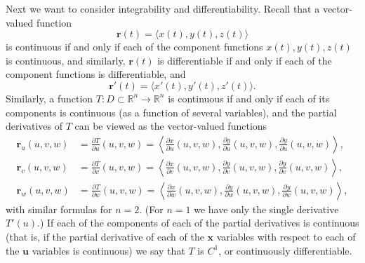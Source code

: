 \documentclass[12pt,letterpaper]{article}
\newcommand{\R}{\mathbb{R}}
\newcommand{\x}{\mathbf{x}}
\newcommand{\uu}{\mathbf{u}}
\renewcommand{\r}{\mathbf{r}}
\begin{document}
Next we want to consider integrability and differentiability. Recall that a vector-valued function
\[
\r(t) = \langle x(t),y(t),z(t)\rangle
\]
is continuous if and only if each of the component functions $x(t), y(t), z(t)$ is continuous, and similarly, $\r(t)$ is differentiable if and only if each of the component functions is differentiable, and 
\[
\r'(t) = \langle x'(t), y'(t), z'(t)\rangle.
\]
Similarly, a function $T:D\subset \R^n \to \R^n$ is continuous if and only if each of its components is continuous (as a function of several variables), and the partial derivatives of $T$ can be viewed as the vector-valued functions
\begin{align*}
\r_u(u,v,w) &= \frac{\partial T}{\partial u}(u,v,w) = \left<\frac{\partial x}{\partial u}(u,v,w),\frac{\partial y}{\partial u}(u,v,w),\frac{\partial y}{\partial u}(u,v,w)\right>,\\
\r_v(u,v,w) &= \frac{\partial T}{\partial v}(u,v,w) = \left<\frac{\partial x}{\partial v}(u,v,w),\frac{\partial y}{\partial v}(u,v,w),\frac{\partial y}{\partial v}(u,v,w)\right>,\\
\r_w(u,v,w) &= \frac{\partial T}{\partial w}(u,v,w) = \left<\frac{\partial x}{\partial w}(u,v,w),\frac{\partial y}{\partial w}(u,v,w),\frac{\partial y}{\partial w}(u,v,w)\right>,
\end{align*}
with similar formulas for $n=2$. (For $n=1$ we have only the single derivative $T'(u)$.) If each of the components of each of the partial derivatives is continuous (that is, if the partial derivative of each of the $\x$ variables with respect to each of the $\uu$ variables is continuous) we say that $T$ is $C^1$, or continuously differentiable.
\end{document}
